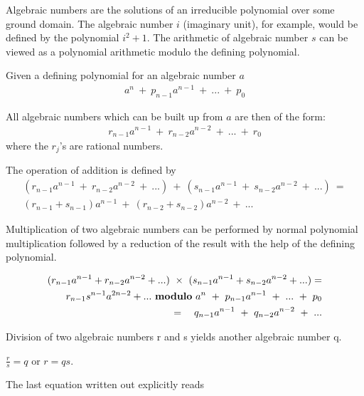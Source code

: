
Algebraic numbers are the solutions of an irreducible polynomial over
some ground domain.   The algebraic number $i$ (imaginary
unit),  for example, would be defined by the
polynomial $i^2 + 1$.  The arithmetic of algebraic number $s$ can be
viewed as a polynomial arithmetic modulo the defining polynomial.

Given a defining polynomial for an algebraic number $a$
\begin{eqnarray*}
a^n ~ + ~ {p _{n-1}} {a ^ {n -1}} ~ + ~ ... ~ + ~ {p_0}
\end{eqnarray*}

All algebraic numbers which can be built up from $a$ are then of the form:
\begin{eqnarray*}
{r_{n-1}} {a ^{n-1}} ~+~ {r_{n-2}} {a ^{n-2}} ~+~ ... ~+~ {r_0}
\end{eqnarray*}
where the $r_j$'s are rational numbers.

The operation of addition is defined by
\begin{eqnarray*}
({r_{n-1}} {a ^{n-1}} ~+~ {r_{n-2}} {a ^{n-2}} ~+~ ...) ~ + ~
({s_{n-1}} {a ^{n-1}} ~+~ {s_{n-2}} {a ^{n-2}} ~+~ ...) ~ =  \\
({r_{n-1}+s_{n-1}}) {a ^{n-1}} ~+~ ({r_{n-2}+s_{n-2}}) {a ^{n-2}} ~+~ ...
\end{eqnarray*}

Multiplication of two algebraic numbers can be performed by normal
polynomial multiplication followed by a reduction of the result with the
help of the defining polynomial.

\begin{eqnarray*}
({r_{n-1}} {a ^{n-1}} + {r_{n-2}} {a ^{n-2}} + ...) ~ \times ~
({s_{n-1}} {a ^{n-1}} + {s_{n-2}} {a ^{n-2}} + ...) = \\
 {r_{n-1}} {s ^{n-1}}{a^{2n-2}} +  ... ~ {\bf modulo} ~
a^n ~ + ~ {p _{n-1}} {a ^ {n -1}} ~ + ~ ... ~ + ~ {p_0} \\
= ~~~{q_{n-1}} a^{n-1} ~ + ~ {q _{n-2}} {a ^ {n -2}} ~ + ~ ...
\end{eqnarray*}

Division of two algebraic numbers r and s yields another algebraic number q.

$ \frac{r}{s} = q$ or $ r = q s $.

The last equation written out explicitly reads

